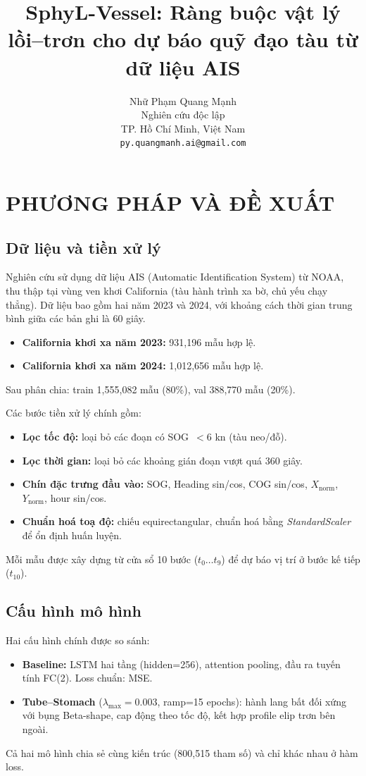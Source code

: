 \documentclass{IEEEtran}
\title{SphyL-Vessel: Ràng buộc vật lý lồi--trơn cho dự báo quỹ đạo tàu từ dữ liệu AIS}
\author{
  Nhữ Phạm Quang Mạnh\\
  Nghiên cứu độc lập\\
  TP. Hồ Chí Minh, Việt Nam\\
  \texttt{py.quangmanh.ai@gmail.com}
}
\begin{document}
\section{PHƯƠNG PHÁP VÀ ĐỀ XUẤT}

\subsection{Dữ liệu và tiền xử lý}
Nghiên cứu sử dụng dữ liệu AIS (Automatic Identification System) từ NOAA,
thu thập tại vùng ven khơi California (tàu hành trình xa bờ, chủ yếu chạy thẳng).
Dữ liệu bao gồm hai năm 2023 và 2024,
với khoảng cách thời gian trung bình giữa các bản ghi là 60 giây.
\begin{itemize}
  \item \textbf{California khơi xa năm 2023:} 931{,}196 mẫu hợp lệ.
  \item \textbf{California khơi xa năm 2024:} 1{,}012{,}656 mẫu hợp lệ.
\end{itemize}
Sau phân chia: train 1{,}555{,}082 mẫu (80\%), val 388{,}770 mẫu (20\%).

Các bước tiền xử lý chính gồm:
\begin{itemize}
  \item \textbf{Lọc tốc độ:} loại bỏ các đoạn có SOG~$< 6$ kn (tàu neo/đỗ).
  \item \textbf{Lọc thời gian:} loại bỏ các khoảng gián đoạn vượt quá 360 giây.
  \item \textbf{Chín đặc trưng đầu vào:} SOG, Heading sin/cos, COG sin/cos,
        $X_{\text{norm}}$, $Y_{\text{norm}}$, hour sin/cos.
  \item \textbf{Chuẩn hoá toạ độ:} chiếu equirectangular, chuẩn hoá bằng
        \textit{StandardScaler} để ổn định huấn luyện.
\end{itemize}
Mỗi mẫu được xây dựng từ cửa sổ 10 bước ($t_0 \ldots t_9$)
để dự báo vị trí ở bước kế tiếp ($t_{10}$).

\subsection{Cấu hình mô hình}
Hai cấu hình chính được so sánh:
\begin{itemize}
  \item \textbf{Baseline:} LSTM hai tầng (hidden=256), attention pooling,
        đầu ra tuyến tính FC(2). Loss chuẩn: MSE.
  \item \textbf{Tube--Stomach} ($\lambda_{\max}=0.003$, ramp=15 epochs):
        hành lang bất đối xứng với bụng Beta-shape, cap động theo tốc độ,
        kết hợp profile elip trơn bên ngoài.
\end{itemize}
Cả hai mô hình chia sẻ cùng kiến trúc (800{,}515 tham số)
và chỉ khác nhau ở hàm loss.
\end{document}
